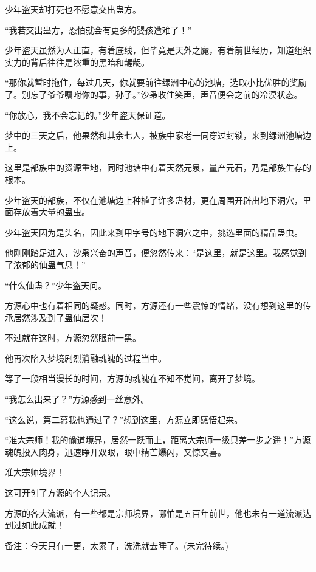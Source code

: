 \begin{this_body}
少年盗天却打死也不愿意交出蛊方。

“我若交出蛊方，恐怕就会有更多的婴孩遭难了！”

少年盗天虽然为人正直，有着底线，但毕竟是天外之魔，有着前世经历，知道组织实力的背后往往是浓重的黑暗和龌龊。

“那你就暂时拖住，每过几天，你就要前往绿洲中心的池塘，选取小比优胜的奖励了。别忘了爷爷嘱咐你的事，孙子。”沙枭收住笑声，声音便会之前的冷漠状态。

“你放心，我不会忘记的。”少年盗天保证道。

梦中的三天之后，他果然和其余七人，被族中家老一同穿过封锁，来到绿洲池塘边上。

这里是部族中的资源重地，同时池塘中有着天然元泉，量产元石，乃是部族生存的根本。

少年盗天的部族，不仅在池塘边上种植了许多蛊材，更在周围开辟出地下洞穴，里面存放着大量的蛊虫。

少年盗天因为是头名，因此来到甲字号的地下洞穴之中，挑选里面的精品蛊虫。

他刚刚踏足进入，沙枭兴奋的声音，便忽然传来：“是这里，就是这里。我感觉到了浓郁的仙蛊气息！”

“什么仙蛊？”少年盗天问。

方源心中也有着相同的疑惑。同时，方源还有一些震惊的情绪，没有想到这里的传承居然涉及到了蛊仙层次！

不过就在这时，方源忽然眼前一黑。

他再次陷入梦境剧烈消融魂魄的过程当中。

等了一段相当漫长的时间，方源的魂魄在不知不觉间，离开了梦境。

“我怎么出来了？”方源感到一丝意外。

“这么说，第二幕我也通过了？”想到这里，方源立即感悟起来。

“准大宗师！我的偷道境界，居然一跃而上，距离大宗师一级只差一步之遥！”方源魂魄投入肉身，迅速睁开双眼，眼中精芒爆闪，又惊又喜。

准大宗师境界！

这可开创了方源的个人记录。

方源的各大流派，有一些都是宗师境界，哪怕是五百年前世，他也未有一道流派达到过如此成就！

备注：今天只有一更，太累了，洗洗就去睡了。(未完待续。)

------------

\end{this_body}

